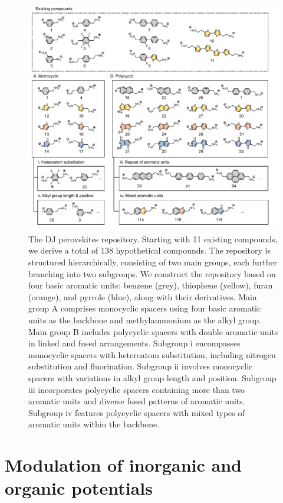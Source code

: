 \clearpage
\begin{figure}[!ht]
\centering
\includegraphics[width=\textwidth]{figures/high-throughput-calculation/figure2.pdf}
\caption[The DJ perovskites repository.]{The DJ perovskites repository. Starting with 11 existing compounds, we derive a total of 138 hypothetical compounds. The repository is structured hierarchically, consisting of two main groups, each further branching into two subgroups. We construct the repository based on four basic aromatic units: benzene (grey), thiophene (yellow), furan (orange), and pyrrole (blue), along with their derivatives. Main group A comprises monocyclic spacers using four basic aromatic units as the backbone and methylammonium as the alkyl group. Main group B includes polycyclic spacers with double aromatic units in linked and fused arrangements. Subgroup i encompasses monocyclic spacers with heteroatom substitution, including nitrogen substitution and fluorination. Subgroup ii involves monocyclic spacers with variations in alkyl group length and position. Subgroup iii incorporates polycyclic spacers containing more than two aromatic units and diverse fused patterns of aromatic units. Subgroup iv features polycyclic spacers with mixed types of aromatic units within the backbone. }
\label{f:fig2}
\end{figure}

\section{Modulation of inorganic and organic potentials} 

